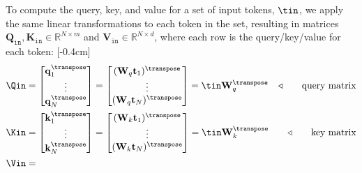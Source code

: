 To compute the query, key, and value for a set of input tokens, $\tin$, we apply the same linear transformations to each token in the set, resulting in matrices $\mathbf{Q}_{\texttt{in}}, \mathbf{K}_{\texttt{in}} \in \mathbb{R}^{N \times m}$ and $\mathbf{V}_{\texttt{in}} \in \mathbb{R}^{N \times d}$, where each row is the query/key/value for each token:
[-0.4cm]
\begin{align}
    \Qin                          & =
    \begin{bmatrix}
        \mathbf{q}_1^\transpose \\
        \vdots                  \\
        \mathbf{q}_N^\transpose \\
    \end{bmatrix}
    =
    \begin{bmatrix}
        (\mathbf{W}_q \mathbf{t}_1)^\transpose \\
        \vdots                                 \\
        (\mathbf{W}_q \mathbf{t}_N)^\transpose \\
    \end{bmatrix}
    = \tin\mathbf{W}_q^\transpose & \triangleleft \quad\quad \text{query matrix} \label{eqn:transformers:query_matrix} \\
    \Kin                          & =
    \begin{bmatrix}
        \mathbf{k}_1^\transpose \\
        \vdots                  \\
        \mathbf{k}_N^\transpose \\
    \end{bmatrix}
    =
    \begin{bmatrix}
        (\mathbf{W}_k \mathbf{t}_1)^\transpose \\
        \vdots                                 \\
        (\mathbf{W}_k \mathbf{t}_N)^\transpose \\
    \end{bmatrix}
    = \tin\mathbf{W}_k^\transpose & \triangleleft \quad\quad \text{key matrix}                                         \\
    \Vin                          & =

\end{align}
